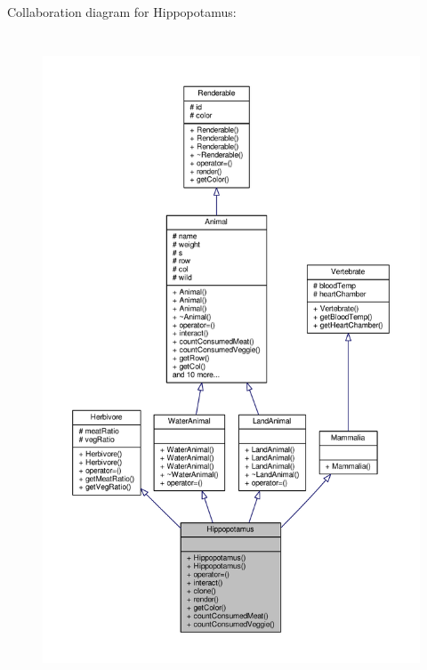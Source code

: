 Collaboration diagram for Hippopotamus\+:
\nopagebreak
\begin{figure}[H]
\begin{center}
\leavevmode
\includegraphics[height=550pt]{classHippopotamus__coll__graph}
\end{center}
\end{figure}
